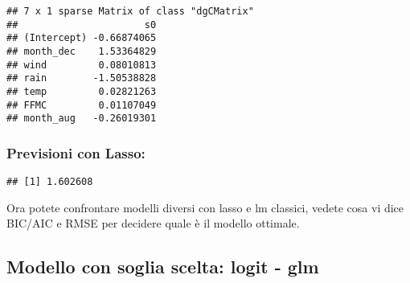 \documentclass[
]{article}
\newenvironment{Shaded}{\begin{snugshade}}{\end{snugshade}}
\newcommand{\AttributeTok}[1]{\textcolor[rgb]{0.13,0.29,0.53}{#1}}
\newcommand{\CommentTok}[1]{\textcolor[rgb]{0.56,0.35,0.01}{\textit{#1}}}
\newcommand{\DecValTok}[1]{\textcolor[rgb]{0.00,0.00,0.81}{#1}}
\newcommand{\FunctionTok}[1]{\textcolor[rgb]{0.13,0.29,0.53}{\textbf{#1}}}
\newcommand{\NormalTok}[1]{#1}
\newcommand{\OtherTok}[1]{\textcolor[rgb]{0.56,0.35,0.01}{#1}}
\newcommand{\SpecialCharTok}[1]{\textcolor[rgb]{0.81,0.36,0.00}{\textbf{#1}}}
\newcommand{\StringTok}[1]{\textcolor[rgb]{0.31,0.60,0.02}{#1}}
\begin{document}
\begin{verbatim}
## 7 x 1 sparse Matrix of class "dgCMatrix"
##                      s0
## (Intercept) -0.66874065
## month_dec    1.53364829
## wind         0.08010813
## rain        -1.50538828
## temp         0.02821263
## FFMC         0.01107049
## month_aug   -0.26019301
\end{verbatim}

\hypertarget{previsioni-con-lasso}{%
\subsubsection{Previsioni con Lasso:}\label{previsioni-con-lasso}}

\begin{Shaded}
\end{Shaded}

\begin{verbatim}
## [1] 1.602608
\end{verbatim}

Ora potete confrontare modelli diversi con lasso e lm classici, vedete
cosa vi dice BIC/AIC e RMSE per decidere quale è il modello ottimale.

\hypertarget{modello-con-soglia-scelta-logit---glm}{%
\subsection{Modello con soglia scelta: logit -
glm}\label{modello-con-soglia-scelta-logit---glm}}
\end{document}
